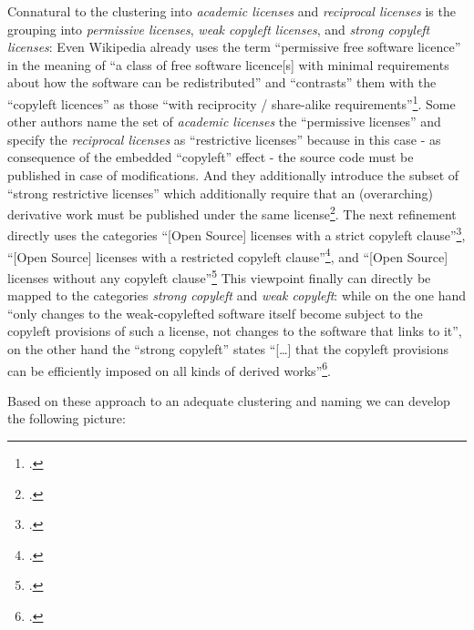 Connatural to the clustering into \emph{academic licenses} and \emph{reciprocal
licenses} is the grouping into \emph{permissive licenses}, \emph{weak copyleft
licenses}, and \emph{strong copyleft licenses}: Even Wikipedia already uses the
term \enquote{permissive free software licence} in the meaning of \enquote{a
class of free software licence[s] with minimal requirements about how the
software can be redistributed} and \enquote{contrasts} them with the
\enquote{copyleft licences} as those \enquote{with reciprocity / share-alike
requirements}\footcite[cf.][\nopage wp]{wpPermLic2013a}. Some other authors name
the set of \emph{academic licenses} the \enquote{permissive licenses} and
specify the \emph{reciprocal licenses} as \enquote{restrictive licenses} because
in this case - as consequence of the embedded \enquote{copyleft} effect - the
source code must be published in case of modifications. And they additionally
introduce the subset of \enquote{strong restrictive licenses} which additionally
require that an (overarching) derivative work must be published under the same
license\footcite[pars pro toto cf.][57]{Buchtala2007a}. The next refinement
directly uses the categories \enquote{[Open Source] licenses with a strict
copyleft clause}\footcite[Originally stated as \enquote{Lizenzen mit einer
strengen Copyleft-Klausel}. Cf.][24]{JaeMet2011a}, \enquote{[Open Source]
licenses with a restricted copyleft clause}\footcite[Originally stated as
\enquote{Lizenzen mit einer beschränkten Copyleft-Klausel}.
Cf.][71]{JaeMet2011a}, and \enquote{[Open Source] licenses without any copyleft
clause}\footcite[Originally stated as \enquote{Lizenzen ohne Copyleft-Klausel}.
cf.][83]{JaeMet2011a} This viewpoint finally can directly be mapped to the
categories \emph{strong copyleft} and \emph{weak copyleft}: while on the one
hand \enquote{only changes to the weak-copylefted software itself become subject
to the copyleft provisions of such a license, not changes to the software that
links to it}, on the other hand the \enquote{strong copyleft} states
\enquote{[\ldots] that the copyleft provisions can be efficiently imposed on all
kinds of derived works}\footcite[cf.][\nopage wp]{wpCopyleft2013a}.


Based on these approach to an adequate clustering and naming we can develop the
following picture:

